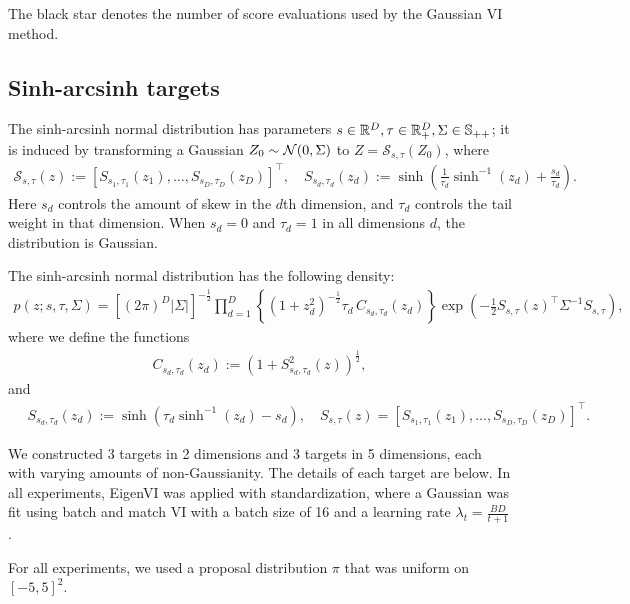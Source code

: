 The black star denotes the number of score evaluations used by the Gaussian
VI method.


\subsection{Sinh-arcsinh targets}
\label{ssec-sinh}

The sinh-arcsinh normal distribution \citep{jones2009sinh,jones2019sinh}
has parameters $s \in \mathbb{R}^D, \tau \in \mathbb{R}_+^D, \Sigma \in \mathbb{S}_{++}$;
it is induced by transforming a
Gaussian $Z_0 \sim \mathcal{N}(0, \Sigma)$ to $Z = \mathcal{S}_{s,\tau}(Z_0)$,
where
\begin{align}
\mathcal{S}_{s,\tau}(z) :=
    [S_{s_1,\tau_1}(z_1), \ldots, S_{s_D,\tau_D}(z_D)]^\top,
    \quad
S_{s_d,\tau_d}(z_d) := \sinh\left(\tfrac{1}{\tau_d} \sinh^{-1}(z_d) + \tfrac{s_d}{\tau_d}\right).
\end{align}
Here $s_d$ controls the amount of skew in the $d$th dimension,
and $\tau_d$ controls the tail weight in that dimension.
When $s_d\!=\!{0}$ and $\tau_d\!=\!{1}$ in all dimensions $d$, the distribution is Gaussian. %



The sinh-arcsinh normal distribution has the following density:
\begin{align}
p(z; s, \tau, \Sigma)
    = [(2\pi)^D |\Sigma|]^{-\frac{1}{2}}
    \prod_{d=1}^D
    \left\{
        (1 + z_d^2)^{-\frac{1}{2}}
\tau_d \, C_{s_d, \tau_d}(z_d)
    \right\}
\exp\left(-\frac{1}{2} S_{s,\tau}(z)^\top \Sigma^{-1} S_{s,\tau}\right),
\end{align}
where we define the functions
\begin{align}
    C_{s_d,\tau_d}(z_d) := (1 + S_{s_d,\tau_d}^2(z))^{\frac{1}{2}},
\end{align}
and
\begin{align}
    \quad
    S_{s_d,\tau_d}(z_d) := \sinh(\tau_d \sinh^{-1}(z_d) - s_d),
    \quad
    S_{s,\tau}(z) =
    [S_{s_1,\tau_1}(z_1), \ldots, S_{s_D,\tau_D}(z_D)]^\top.
\end{align}

We constructed 3 targets in 2 dimensions and 3 targets in 5 dimensions,
each with varying amounts of non-Gaussianity.
The details of each target are below.
In all experiments, EigenVI was applied with standardization,
where a Gaussian was fit using batch and match VI with a batch size of 16
and a learning rate $\lambda_t = \tfrac{BD}{t+1}$.
%


For all experiments, we used a proposal distribution $\pi$
that was uniform on $[-5,5]^2$.


